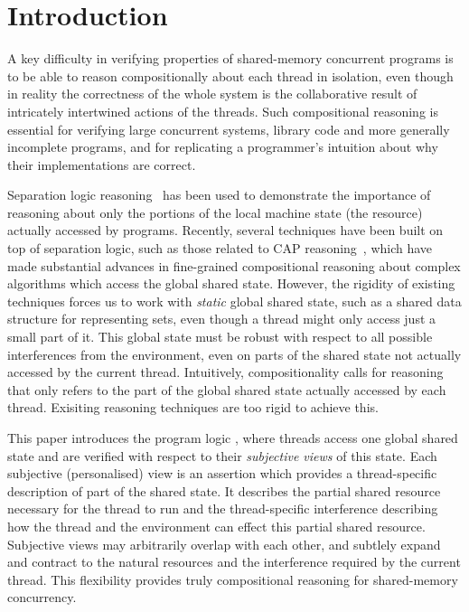 \section{Introduction}





A key difficulty in verifying properties of shared-memory concurrent
programs is to be able to reason compositionally about each thread in
isolation, even though in reality the correctness of the whole system
is the collaborative result of intricately intertwined actions of the
threads.  Such compositional reasoning is essential for verifying
large concurrent systems, library code and more generally incomplete
programs, and for replicating a programmer's intuition about why their
implementations are correct.

Separation logic reasoning~\cite{seplog,csl-tcs} has
been used to demonstrate the importance of reasoning about only the
portions of the local machine state (the resource) actually accessed
by programs. Recently, several techniques have been built on top of
separation logic, such as those related to CAP
reasoning~\cite{lotsofthem}, which have made substantial advances in
fine-grained compositional reasoning about complex algorithms which
access the global shared state.  However, the rigidity of existing
techniques forces us to work with {\em static} global shared state,
such as a shared data structure for representing sets, even though a
thread might only access just a small part of it.  This global state
must be robust with respect to all possible interferences from the
environment, {even on parts of the shared state not actually accessed
  by the current thread}.  Intuitively, compositionality calls for
reasoning that only refers to the part of the global shared state actually
accessed by each thread.  Exisiting reasoning techniques are too rigid
to achieve this. 



This paper introduces the program logic \colosl, where  threads access one
global shared state and are verified with respect to their
\emph{subjective views} of this state. Each
subjective (personalised) view  is an assertion which provides a thread-specific description
of part of the shared state. It describes 
the partial shared resource necessary
for the thread to run and the  thread-specific interference 
describing how the thread and the environment can effect this partial
shared resource. Subjective views may arbitrarily overlap with each
other, and subtlely expand and contract  to the natural resources and the 
interference required by  the current thread. 
This flexibility
provides truly compositional reasoning  for shared-memory concurrency.


